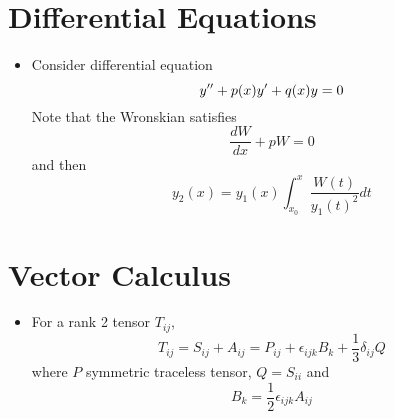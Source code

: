\documentclass[10pt, a4paper, twoside]{report}
\begin{document}
    \section{Differential Equations}
    \begin{itemize}
        \item Consider differential equation 
        \[y^{\prime\prime}+p(x)y^\prime+q(x)y=0\]
        Note that the Wronskian satisfies 
        \[\frac{dW}{dx}+pW=0\]
        and then 
        \[y_2(x)=y_1(x)\int_{x_0}^x\frac{W(t)}{y_1(t)^2}dt\]
    \end{itemize}
    \section{Vector Calculus}
    \begin{itemize}
        \item For a rank 2 tensor \(T_{ij}\),
        \[T_{ij}=S_{ij}+A_{ij}=P_{ij}+\epsilon_{ijk}B_k+\frac 13\delta_{ij}Q\]
        where \(P\) symmetric traceless tensor, \(Q=S_{ii}\) and 
        \[B_{k}=\frac 12\epsilon_{ijk}A_{ij}\]
    \end{itemize}
\end{document}
